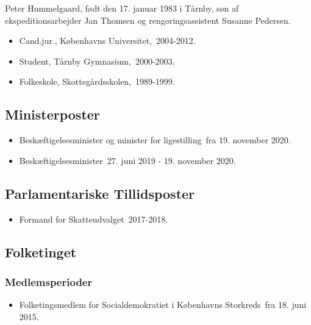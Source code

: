 \documentclass[11pt, a4paper]{awesome-cv}
\begin{document}
\makecvheader[R]
\makelettertitle
\begin{cvletter}
Peter Hummelgaard, født den 17. januar 1983 i Tårnby, søn af ekspeditionsarbejder Jan Thomsen og rengøringsassistent Susanne Pedersen.

\begin{itemize}
\item Cand.jur., Københavns Universitet, 2004-2012.
\item Student, Tårnby Gymnasium, 2000-2003.
\item Folkeskole, Skottegårdsskolen, 1989-1999.
\end{itemize}
\subsection*{Ministerposter}
\begin{itemize}
\item Beskæftigelsesminister og minister for ligestilling fra 19. november 2020.
\item Beskæftigelsesminister 27. juni 2019 - 19. november 2020.
\end{itemize}
\subsection*{Parlamentariske Tillidsposter}
\begin{itemize}
\item Formand for Skatteudvalget 2017-2018.
\end{itemize}
\subsection*{Folketinget}
\subsubsection*{Medlemsperioder}
\begin{itemize}
\item Folketingsmedlem for Socialdemokratiet i Københavns Storkreds fra 18. juni 2015.
\end{itemize}

\end{cvletter}
\end{document}
